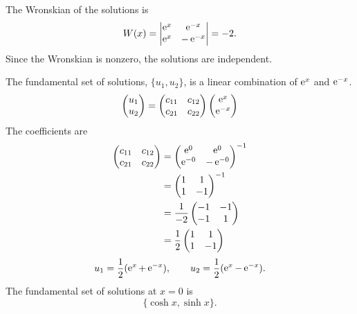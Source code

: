 \begin{Solution}
  \label{solution fundamental set y-y=0}
  The Wronskian of the solutions is
  \[ 
  W(x) =       \begin{vmatrix}
    \mathop{\mathrm{e}}\nolimits^x     &       \mathop{\mathrm{e}}\nolimits^{-x}  \\
    \mathop{\mathrm{e}}\nolimits^x     &       -\mathop{\mathrm{e}}\nolimits^{-x}
  \end{vmatrix}
  = -2. 
  \]
  Since the Wronskian is nonzero, the solutions are independent.

  The fundamental set of solutions, $\{u_1, u_2\}$, is a linear combination
  of $\mathop{\mathrm{e}}\nolimits^x$ and $\mathop{\mathrm{e}}\nolimits^{-x}$.
  \[
  \begin{pmatrix}
    u_1 \\
    u_2
  \end{pmatrix}
  =
  \begin{pmatrix}
    c_{11} & c_{12} \\
    c_{21} & c_{22}
  \end{pmatrix}
  \begin{pmatrix}
    \mathop{\mathrm{e}}\nolimits^x \\
    \mathop{\mathrm{e}}\nolimits^{-x}
  \end{pmatrix}
  \]
  The coefficients are
  \begin{align*}
    \begin{pmatrix}
      c_{11} & c_{12} \\
      c_{21} & c_{22}
    \end{pmatrix}
    &=
    \begin{pmatrix}
      \mathop{\mathrm{e}}\nolimits^0 & \mathop{\mathrm{e}}\nolimits^0 \\
      \mathop{\mathrm{e}}\nolimits^{-0} & - \mathop{\mathrm{e}}\nolimits^{-0}
    \end{pmatrix}^{-1} \\
    &=
    \begin{pmatrix}
      1 & 1 \\
      1 & -1
    \end{pmatrix}^{-1} \\
    &=
    \frac{1}{-2}
    \begin{pmatrix}
      -1 & -1 \\
      -1 & 1
    \end{pmatrix} \\
    &=
    \frac{1}{2}
    \begin{pmatrix}
      1 & 1 \\
      1 & -1
    \end{pmatrix} 
  \end{align*}
  \[ 
  u_1 = \frac{1}{2} (\mathop{\mathrm{e}}\nolimits^x + \mathop{\mathrm{e}}\nolimits^{-x}), \qquad u_2 = \frac{1}{2}(\mathop{\mathrm{e}}\nolimits^x-\mathop{\mathrm{e}}\nolimits^{-x}).
  \]
  The fundamental set of solutions at $x = 0$ is 
  \[ 
  \boxed{ 
    \{\cosh x, \sinh x\}.
    } 
  \]
\end{Solution}








